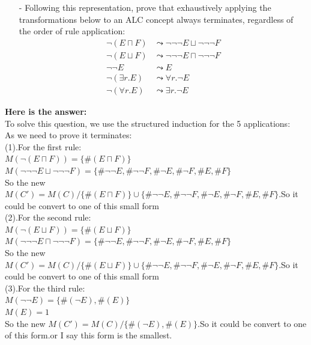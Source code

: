 \documentclass{article}
\begin{document}
    \begin{itemize}
        \item[-] Following this representation, prove that exhaustively applying the transformations below to an ALC concept always terminates, regardless of the order of rule application:
        \begin{align*}
            \neg(E\sqcap F)&\leadsto\neg\neg\neg E\sqcup\neg\neg\neg F\\
            \neg(E\sqcup F)&\leadsto\neg\neg\neg E\sqcap\neg\neg\neg F\\
            \neg\neg E&\leadsto E\\
            \neg(\exists r.E)&\leadsto\forall r.\neg E\\
            \neg(\forall r.E)&\leadsto\exists r.\neg E
        \end{align*}
    \end{itemize}
    \textbf{Here is the answer:}\\
    To solve this question, we use the structured induction for the 5 applications:\\
    As we need to prove it terminates:\\
    (1).For the first rule:\\
    $M(\neg (E \sqcap F)) = \{\#(E \sqcap F)\}$\\
    $M(\neg\neg\neg E\sqcup\neg\neg\neg F) =\{\#\neg\neg E,\#\neg\neg F,\#\neg E,\#\neg F,\# E,\# F\}$\\
    So the new $M(C') = M(C) / \{\#(E \sqcap F)\} \cup \{\#\neg\neg E,\#\neg\neg F,\#\neg E,\#\neg F,\# E,\# F\}$.So it could be convert to one of this small form\\
    (2).For the second rule:\\
    $M(\neg (E \sqcup F)) = \{\#(E \sqcup F)\}$\\
    $M(\neg\neg\neg E\sqcap\neg\neg\neg F) =  \{\#\neg\neg E,\#\neg\neg F,\#\neg E,\#\neg F,\# E,\# F\}$\\
    So the new $M(C') = M(C) / \{\#(E \sqcup F)\} \cup \{\#\neg\neg E,\#\neg\neg F,\#\neg E,\#\neg F,\# E,\# F\}$.So it could be convert to one of this small form\\
    (3).For the third rule:\\
    $M(\neg\neg E) = \{\#(\neg E), \#(E)\}$\\
    $M(E) = 1$\\
    So the new $M(C') = M(C) / \{\#(\neg E), \#(E)\}$.So it could be convert to one of this form.or I say this form is the smallest.\\
\end{document}
